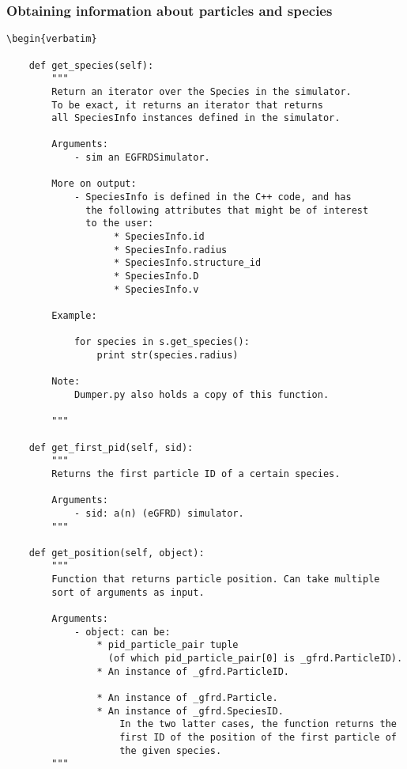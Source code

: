\documentclass[a4paper,10pt]{article}
\begin{document}
\subsubsection{Obtaining information about particles and species}

\begin{verbatim}
\begin{verbatim}

    def get_species(self):
        """
        Return an iterator over the Species in the simulator. 
        To be exact, it returns an iterator that returns 
        all SpeciesInfo instances defined in the simulator.
        
        Arguments: 
            - sim an EGFRDSimulator. 

        More on output:
            - SpeciesInfo is defined in the C++ code, and has
              the following attributes that might be of interest
              to the user:
                   * SpeciesInfo.id
                   * SpeciesInfo.radius
                   * SpeciesInfo.structure_id
                   * SpeciesInfo.D
                   * SpeciesInfo.v
                
        Example:

            for species in s.get_species():
                print str(species.radius)

        Note:
            Dumper.py also holds a copy of this function.        

        """

    def get_first_pid(self, sid):
        """
        Returns the first particle ID of a certain species.

        Arguments:
            - sid: a(n) (eGFRD) simulator.
        """

    def get_position(self, object):
        """
        Function that returns particle position. Can take multiple
        sort of arguments as input. 

        Arguments:
            - object: can be:
                * pid_particle_pair tuple 
                  (of which pid_particle_pair[0] is _gfrd.ParticleID).
                * An instance of _gfrd.ParticleID.

                * An instance of _gfrd.Particle.
                * An instance of _gfrd.SpeciesID.
                    In the two latter cases, the function returns the 
                    first ID of the position of the first particle of 
                    the given species.
        """ 
 
\end{verbatim}
\end{document}
